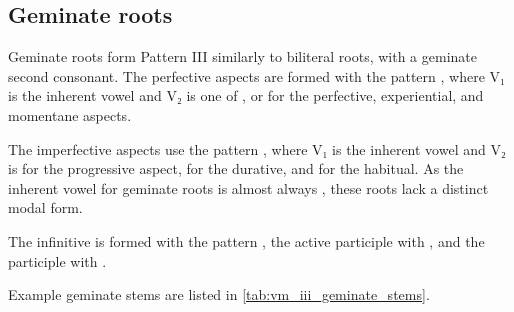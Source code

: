 \documentclass[grammar]{subfiles}
\begin{document}
\subsection{Geminate roots}
\label{ssec:vm_iii_geminate_roots}

Geminate roots form Pattern III similarly to biliteral roots, with a geminate
second consonant.  The perfective aspects are formed with the pattern
, where V₁ is the inherent vowel and V₂ is one of ,
 or  for the perfective, experiential, and momentane aspects.  

The imperfective aspects use the pattern , where V₁ is the
inherent vowel and V₂ is  for the progressive aspect,  for the
durative, and  for the habitual. As the inherent vowel for geminate
roots is almost always , these roots lack a distinct modal form.

The infinitive is formed with the pattern , the active participle
with , and the participle with .  

Example geminate stems are listed in \cref{tab:vm_iii_geminate_stems}.

\begin{table}[h!]\small\capstart
  \centering
  \\
  \caption{Pattern III geminate stems \label{tab:vm_iii_geminate_stems}}
\end{table}
\end{document}
